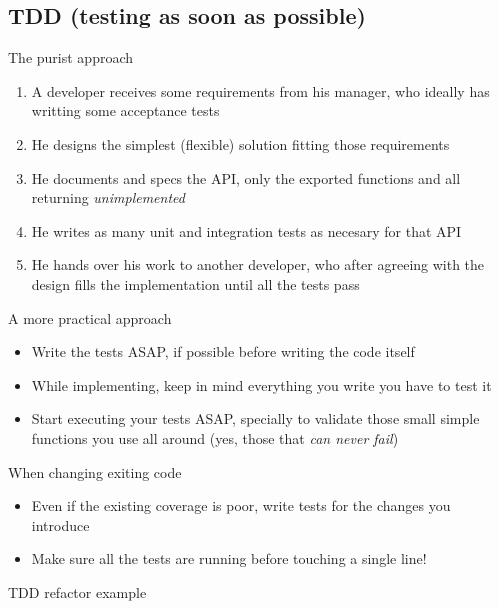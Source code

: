 \documentclass[pdf]{beamer}
\begin{document}
\subsection*{TDD (testing as soon as possible)}
\label{tdd}


\begin{frame}{The purist approach}
    \begin{enumerate}
    \item A developer receives some requirements from his manager, who ideally has writting some acceptance tests
    \item He designs the simplest (flexible) solution fitting those requirements
    \item He documents and specs the API, only the exported functions and all returning \emph{unimplemented}
    \item He writes as many unit and integration tests as necesary for that API
    \item He hands over his work to another developer, who after agreeing with the design fills the implementation until
    all the tests pass
    \end{enumerate}
\end{frame}

\begin{frame}{A more practical approach}
    \begin{itemize}
    \item Write the tests ASAP, if possible before writing the code itself
    \item While implementing, keep in mind everything you write you have to test it
    \item Start executing your tests ASAP, specially to validate those small simple functions you use all around (yes,
    those that \emph{can never fail})
    \end{itemize}
    When changing exiting code
    \begin{itemize}
    \item Even if the existing coverage is poor, write tests for the changes you introduce
    \item Make sure all the tests are running before touching a single line!
    \end{itemize}
\end{frame}

\begin{frame}{TDD refactor example}
\end{frame}
\end{document}
